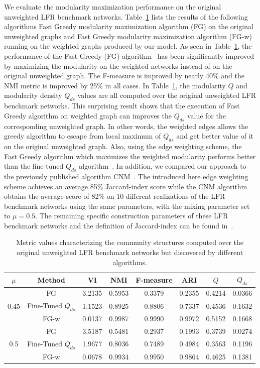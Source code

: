 We evaluate the modularity maximization performance on the original unweighted LFR benchmark networks. Table~\ref{table:LFR} lists the results of the following algorithms Fast Greedy modularity maximization algorithm (FG) on the original unweighted graphs and Fast Greedy modularity maximization algorithm (FG-w) running on the weighted graphs produced by our model. As seen in Table~\ref{table:LFR}, the performance of the Fast Greedy (FG) algorithm~\cite{clauset2004finding} has been significantly improved by maximizing the modularity on the weighted networks instead of on the original unweighted graph. The F-measure is improved by nearly 40\% and the NMI metric is improved by 25\% in all cases. In Table~\ref{table:LFR}, the modularity $Q$ and modularity density $Q_{ds}$ values are all computed over the original unweighted LFR benchmark networks. This surprising result shows that the execution of Fast Greedy algorithm on weighted graph can improves the $Q_{ds}$ value for the corresponding unweighted graph. In other words, the weighted edges allows the greedy algorithm to escape from local maximum of $Q_{ds}$ and get better value of it on the original unweighted graph. Also, using the edge weighting scheme, the Fast Greedy algorithm which maximizes the weighted modularity performs better than the fine-tuned $Q_{ds}$ algorithm~\cite{chen2014community}. In addition, we compared our approach to the previously published algorithm CNM~\cite{berry2011tolerating}. The introduced here edge weighting scheme achieves an average 85\% Jaccard-index score while the CNM algorithm obtains the average score of 82\% on 10 different realizations of the LFR benchmark networks using the same parameters, with the mixing parameter set to $\mu=0.5$. The remaining specific construction parameters of these LFR benchmark networks and the definition of Jaccard-index can be found in~\cite{berry2011tolerating}.
\begin{table}[!t]
\caption{Metric values characterizing the community structures computed over the original unweighted LFR benchmark networks but discovered by different algorithms.}
\label{table:LFR}
\centering
\setlength\tabcolsep{2pt}
\begin{tabular}{|c|c||c|c|c|c|c|c|}
\hline
$\mu$ & Method & VI & NMI & F-measure & ARI & $Q$ & $Q_{ds}$ \\
\hline
\hline
\multirow{3}{*}{0.45} & FG &3.2135&0.5953&0.3379&0.2355&0.4214&0.0366\\
\hhline{~-------}
& Fine-Tuned $Q_{ds}$ & 1.1523 & 0.8925 & 0.8806 & 0.7337 & 0.4536 & 0.1632\\
\hhline{~-------}
& FG-w & 0.0137 & 0.9987 & 0.9990 & 0.9972 & 0.5152 & 0.1668\\
\hline
\multirow{3}{*}{0.5} & FG &3.5187&0.5481&0.2937&0.1993&0.3739&0.0274\\
\hhline{~-------}
& Fine-Tuned $Q_{ds}$ & 1.9677 & 0.8036 & 0.7489 & 0.4984 & 0.3563 & 0.1196\\
\hhline{~-------}
& FG-w & 0.0678 & 0.9934 & 0.9950 & 0.9864 & 0.4625 & 0.1381\\
\hline
\end{tabular}
\end{table}
